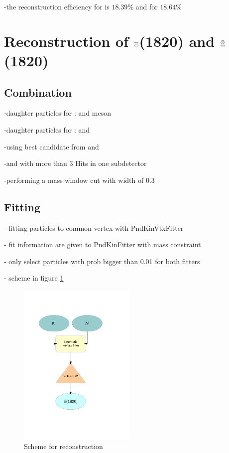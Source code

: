 		-the reconstruction efficiency for \anticascade is $18.39\%$ and for \cascade $18.64\%$
		
	
	
	

\section{Reconstruction of $\boldmath{\Xi}$(1820) and $\boldmath{\bar{\Xi}}$(1820)}
		\subsection{Combination}

		
		-daughter particles for \excitedcascade: \lam and \kminus meson
		
		-daughter particles for \excitedanticascade: \alam and \kplus 
		
		-using best candidate from \lam and \alam
		
		-\kplus and \kminus with more than 3 Hits in one subdetector 
		
		-performing a mass window cut with width of $0.3$\massunit 
		
		
	\subsection{Fitting}
	
		- fitting particles to common vertex with PndKinVtxFitter
		
		- fit information are given to PndKinFitter with mass constraint
		
		- only select particles with prob bigger than 0.01 for both fitters
		
		- scheme in figure \ref{fig:excitedcascade_scheme}
		
		\begin{figure}
			\centering
				\includegraphics[width=0.50\textwidth]{./plots/combineExcitedCascade.pdf}
			\caption{Scheme for \excitedcascade reconstruction}
			\label{fig:excitedcascade_scheme}
		\end{figure}
		
